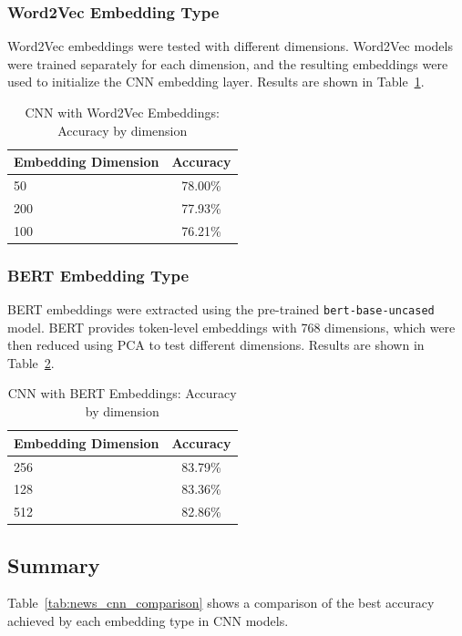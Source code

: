 \documentclass[12pt,a4paper]{article}
\begin{document}
\subsubsection{Word2Vec Embedding Type}

Word2Vec embeddings were tested with different dimensions. Word2Vec models were trained separately for each dimension, and the resulting embeddings were used to initialize the CNN embedding layer. Results are shown in Table~\ref{tab:news_cnn_w2v}.

\begin{table}[h]
\centering
\begin{tabular}{lc}
\toprule
Embedding Dimension & Accuracy \\
\midrule
50 & 78.00\% \\
200 & 77.93\% \\
100 & 76.21\% \\
\bottomrule
\end{tabular}
\caption{CNN with Word2Vec Embeddings: Accuracy by dimension}
\label{tab:news_cnn_w2v}
\end{table}

\subsubsection{BERT Embedding Type}

BERT embeddings were extracted using the pre-trained \texttt{bert-base-uncased} model. BERT provides token-level embeddings with 768 dimensions, which were then reduced using PCA to test different dimensions. Results are shown in Table~\ref{tab:news_cnn_bert}.

\begin{table}[h]
\centering
\begin{tabular}{lc}
\toprule
Embedding Dimension & Accuracy \\
\midrule
256 & 83.79\% \\
128 & 83.36\% \\
512 & 82.86\% \\
\bottomrule
\end{tabular}
\caption{CNN with BERT Embeddings: Accuracy by dimension}
\label{tab:news_cnn_bert}
\end{table}

\subsection{Summary}

Table~\ref{tab:news_cnn_comparison} shows a comparison of the best accuracy achieved by each embedding type in CNN models.
\end{document}
